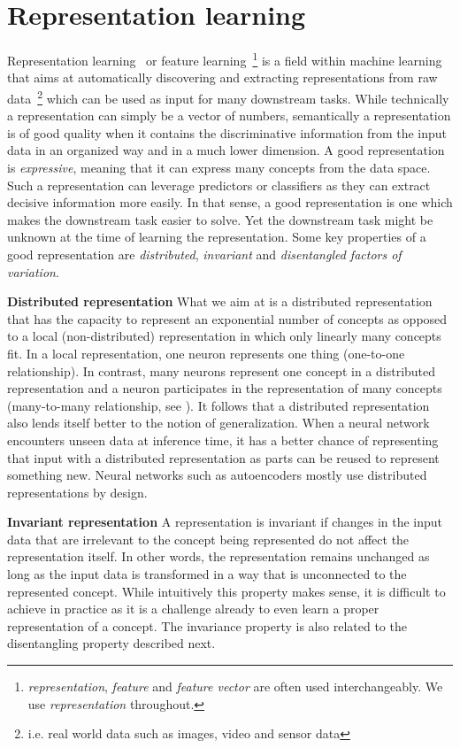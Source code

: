 \documentclass[a4paper,12pt]{report}
\begin{document}
\section{Representation learning}
Representation learning~\cite{ReprLearning} or feature learning~\footnote{\textit{representation}, \textit{feature} and \textit{feature vector} are often used interchangeably. We use \textit{representation} throughout.} is a field within machine learning that aims at automatically discovering and extracting representations from raw data~\footnote{i.e. real world data such as images, video and sensor data} which can be used as input for many downstream tasks. While technically a representation can simply be a vector of numbers, semantically a representation is of good quality when it contains the discriminative information from the input data in an organized way and in a much lower dimension. A good representation is \textit{expressive}, meaning that it can express many concepts from the data space. Such a representation can leverage predictors or classifiers as they can extract decisive information more easily. In that sense, a good representation is one which makes the downstream task easier to solve. Yet the downstream task might be unknown at the time of learning the representation. Some key properties of a good representation are \textit{distributed}, \textit{invariant} and \textit{disentangled factors of variation}.

\textbf{Distributed representation}
What we aim at is a distributed representation that has the capacity to represent an exponential number of concepts as opposed to a local (non-distributed) representation in which only linearly many concepts fit. In a local representation, one neuron represents one thing (one-to-one relationship). In contrast, many neurons represent one concept in a distributed representation and a neuron participates in the representation of many concepts (many-to-many relationship, see \cite{DistrRepHinton}). It follows that a distributed representation also lends itself better to the notion of generalization. When a neural network encounters unseen data at inference time, it has a better chance of representing that input with a distributed representation as parts can be reused to represent something new. Neural networks such as autoencoders mostly use distributed representations by design.

\textbf{Invariant representation}
A representation is invariant if changes in the input data that are irrelevant to the concept being represented do not affect the representation itself. In other words, the representation remains unchanged as long as the input data is transformed in a way that is unconnected to the represented concept. While intuitively this property makes sense, it is difficult to achieve in practice as it is a challenge already to even learn a proper representation of a concept. The invariance property is also related to the disentangling property described next.
\end{document}
